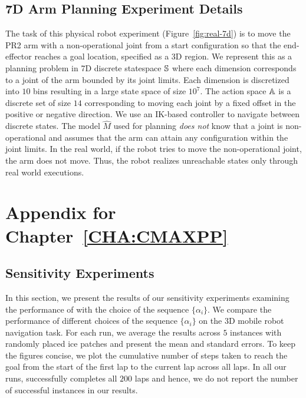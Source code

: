 \subsection{7D Arm Planning Experiment Details}
\label{sec:7d-arm-planning}

The task of this physical robot experiment (Figure~\ref{fig:real-7d}) is
to move the PR2 arm with a
non-operational joint from a start configuration so that the
end-effector reaches a goal location, specified as a 3D
region. We represent this as a planning problem in 7D
discrete statespace $\mathbb{S}$ where each dimension corresponds to
a joint of the arm bounded by its joint limits. Each dimension is
discretized into $10$ bins resulting in a large state space of
size $10^7$. The action space
$\mathbb{A}$ is a discrete set of size
$14$ corresponding to moving each joint by a fixed offset in the
positive or negative direction. We use an IK-based controller to
navigate between discrete states. The model $\hat{M}$ used for
planning \textit{does not} know that a joint is non-operational and
assumes that the arm can attain any configuration within the joint
limits. In the real world, if the robot tries to move the
non-operational joint, the arm does not move. Thus, the robot realizes
unreachable states only through real world executions.

\clearpage
\newpage
\section{Appendix for Chapter~\ref{CHA:CMAXPP}}
\label{sec:append-chapt-cmaxpp}

\subsection{Sensitivity Experiments}
\label{sec:sens-exper}

In this section, we present the results of our sensitivity experiments
examining the performance of \acmaxpp{} with the choice of the
sequence $\{\alpha_i\}$. We compare the performance of different
choices of the sequence $\{\alpha_i\}$ on the $3$D mobile robot
navigation task. For each run, we average the results across $5$
instances with randomly placed ice patches and present the mean and
standard errors. To keep the figures concise, we plot the cumulative
number of steps taken to reach the goal from the start of the first
lap to the current lap across all laps. In all our runs, \acmaxpp{}
successfully completes all $200$ laps and hence, we do not report the
number of successful instances in our results.

